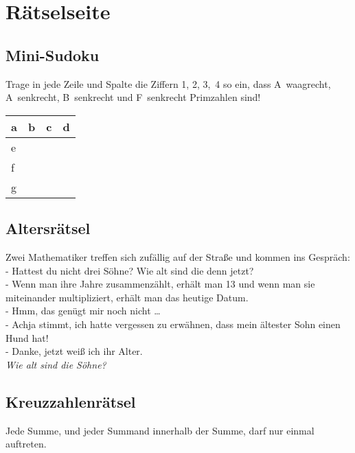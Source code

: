 \chapter{Rätselseite}

\raggedcolumns
\begin{multicols}{2}
	\section*{Mini-Sudoku}
	Trage in jede Zeile und Spalte die Ziffern 1, 2, 3,~4 so ein, dass A~waagrecht, A~senkrecht, B~senkrecht und F~senkrecht Primzahlen sind!

	\begin{center}
		\begin{tabular}{ |p{0.5cm}|p{0.5cm}|p{0.5cm}|p{0.5cm}| }
		\hline
		  a & b & c & d \\[0.5cm]
		\hline
		  e &   &   &   \\[0.5cm]
		\hline
		  f &   &   &   \\[0.5cm]
		\hline
		  g &   &   &   \\[0.5cm]
		\hline
		\end{tabular}
	\end{center}

	\section*{Altersrätsel}
	
	Zwei Mathematiker treffen sich zufällig auf der Straße und kommen ins Gespräch:\\
	- Hattest du nicht drei Söhne? Wie alt sind die denn jetzt?\\
	- Wenn man ihre Jahre zusammenzählt, erhält man 13 und wenn man sie miteinander multipliziert,
 	erhält man das heutige Datum.\\
	- Hmm, das genügt mir noch nicht \ldots\\
	- Achja stimmt, ich hatte vergessen zu erwähnen, dass mein ältester Sohn einen Hund hat!\\
	- Danke, jetzt weiß ich ihr Alter.\\

	\emph{Wie alt sind die Söhne?}

		\columnbreak
		\columnbreak
	\section*{Kreuzzahlenrätsel}
	Jede Summe, und jeder Summand innerhalb der Summe, darf nur einmal auftreten.


\end{multicols}
